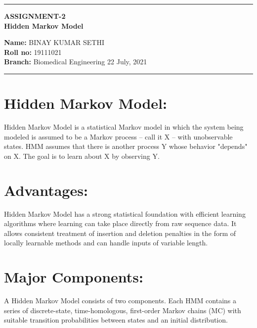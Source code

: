 \documentclass[10pt,a4paper,twoside]{article}
\begin{document}
\begin{center}
\hrule

\vspace{.4cm}
{\bf {\Large ASSIGNMENT-2 }}\\
\vspace{.3cm}
{\bf {\huge Hidden Markov Model}}
\vspace{.3cm}
\end{center}
{\bf Name:}  BINAY KUMAR SETHI\\
{\bf Roll no:}  19111021 \\
{\bf Branch: }  Biomedical Engineering \hspace{\fill}  22 July, 2021 \\
\hrule

\vspace{.3cm}
\section{Hidden Markov Model:} 
Hidden Markov Model is a statistical Markov model in which the system being modeled is assumed to be a Markov process – call it X – with unobservable states. HMM assumes that there is another process Y whose behavior "depends" on X. The goal is to learn about X by observing Y. 

\section{Advantages:}
Hidden Markov Model has a strong statistical foundation with efficient learning algorithms where learning can take place directly from raw sequence data. It allows consistent treatment of insertion and deletion penalties in the form of locally learnable methods and can handle inputs of variable length. 

\section{Major Components:}
A Hidden Markov Model consists of two components. Each HMM contains a series of discrete-state, time-homologous, first-order Markov chains (MC) with suitable transition probabilities between states and an initial distribution.
\end{document}
